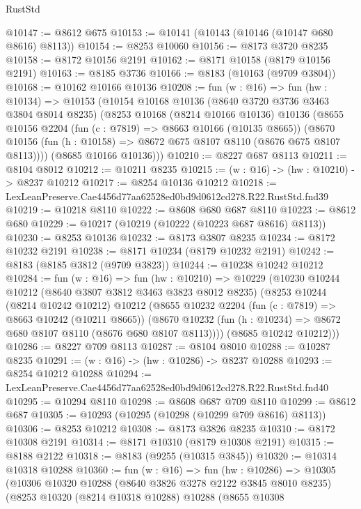 \begin{lexlean}{RustStd}
\begin{coremodule}
@10147 := @8612 @675
@10153 := @10141 (@10143 (@10146 (@10147 @680 @8616) @8113))
@10154 := @8253 @10060
@10156 := @8173 @3720 @8235
@10158 := @8172 @10156 @2191
@10162 := @8171 @10158 (@8179 @10156 @2191)
@10163 := @8185 @3736
@10166 := @8183 (@10163 (@9709 @3804))
@10168 := @10162 @10166 @10136
@10208 := fun (w : @16) =>
  fun (hw : @10134) =>
  @10153
    (@10154
      @10168
      @10136
      (@8640 @3720 @3736 @3463 @3804 @8014 @8235)
      (@8253
        @10168
        (@8214 @10166 @10136)
        @10136
        (@8655
          @10156
          @2204
          (fun (c : @7819) => @8663 @10166 (@10135 @8665))
          (@8670 @10156 (fun (h : @10158) => @8672 @675 @8107 @8110 (@8676 @675 @8107 @8113))))
        (@8685 @10166 @10136)))
@10210 := @8227 @687 @8113
@10211 := @8104 @8012
@10212 := @10211 @8235
@10215 := (w : @16) -> (hw : @10210) -> @8237 @10212
@10217 := @8254 @10136 @10212
@10218 := LexLeanPreserve.Cae4456d77aa62528ed0bd9d0612cd278.R22.RustStd.fnd39
@10219 := @10218 @8110
@10222 := @8608 @680 @687 @8110
@10223 := @8612 @680
@10229 := @10217 (@10219 (@10222 (@10223 @687 @8616) @8113))
@10230 := @8253 @10136
@10232 := @8173 @3807 @8235
@10234 := @8172 @10232 @2191
@10238 := @8171 @10234 (@8179 @10232 @2191)
@10242 := @8183 (@8185 @3812 (@9709 @3823))
@10244 := @10238 @10242 @10212
@10284 := fun (w : @16) =>
  fun (hw : @10210) =>
  @10229
    (@10230
      @10244
      @10212
      (@8640 @3807 @3812 @3463 @3823 @8012 @8235)
      (@8253
        @10244
        (@8214 @10242 @10212)
        @10212
        (@8655
          @10232
          @2204
          (fun (c : @7819) => @8663 @10242 (@10211 @8665))
          (@8670 @10232 (fun (h : @10234) => @8672 @680 @8107 @8110 (@8676 @680 @8107 @8113))))
        (@8685 @10242 @10212)))
@10286 := @8227 @709 @8113
@10287 := @8104 @8010
@10288 := @10287 @8235
@10291 := (w : @16) -> (hw : @10286) -> @8237 @10288
@10293 := @8254 @10212 @10288
@10294 := LexLeanPreserve.Cae4456d77aa62528ed0bd9d0612cd278.R22.RustStd.fnd40
@10295 := @10294 @8110
@10298 := @8608 @687 @709 @8110
@10299 := @8612 @687
@10305 := @10293 (@10295 (@10298 (@10299 @709 @8616) @8113))
@10306 := @8253 @10212
@10308 := @8173 @3826 @8235
@10310 := @8172 @10308 @2191
@10314 := @8171 @10310 (@8179 @10308 @2191)
@10315 := @8188 @2122
@10318 := @8183 (@9255 (@10315 @3845))
@10320 := @10314 @10318 @10288
@10360 := fun (w : @16) =>
  fun (hw : @10286) =>
  @10305
    (@10306
      @10320
      @10288
      (@8640 @3826 @3278 @2122 @3845 @8010 @8235)
      (@8253
        @10320
        (@8214 @10318 @10288)
        @10288
        (@8655
          @10308

\end{coremodule}
\end{lexlean}
